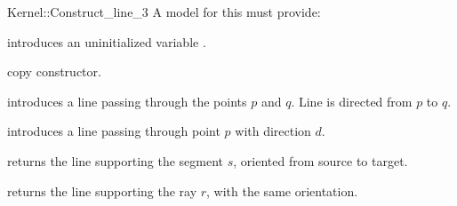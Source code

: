 \begin{ccRefFunctionObjectConcept}{Kernel::Construct_line_3}
A model for this must provide:


\ccHidden {}
             {introduces an uninitialized variable .}

\ccHidden {}
 	    {copy constructor.}

            {introduces a line  passing through the points $p$ and $q$. 
             Line  is directed from $p$ to $q$.}


            {introduces a line  passing through point $p$ with 
             direction $d$.}

            {returns the line supporting the segment $s$,
	    oriented from source to target.}

            {returns the line supporting the ray $r$, with the
	    same orientation.}

\end{ccRefFunctionObjectConcept}
